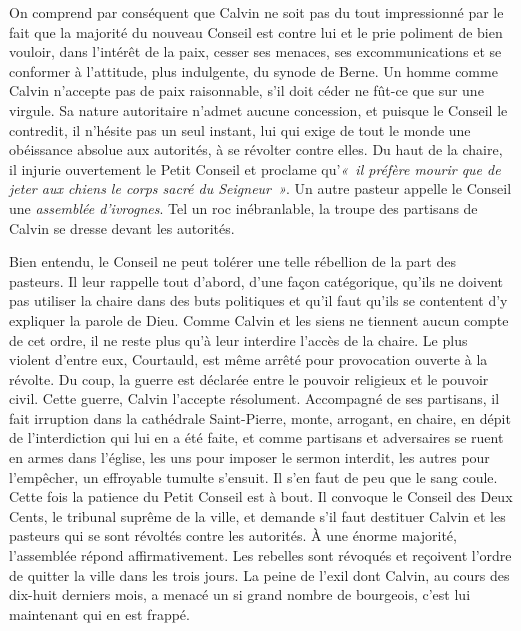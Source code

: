 \documentclass[french,twoside]{book} %
\newcommand{\astermono}{\medskip\centerline{\color{rubric}\large\selectfont{\syms ✻}}\medskip\par}%
\begin{document}
On comprend par conséquent que Calvin ne soit pas du tout impressionné par le fait que la majorité du nouveau Conseil est contre lui et le prie poliment de bien vouloir, dans l’intérêt de la paix, cesser ses menaces, ses excommunications et se conformer à l’attitude, plus indulgente, du synode de Berne. Un homme comme Calvin n’accepte pas de paix raisonnable, s’il doit céder ne fût-ce que sur une virgule. Sa nature autoritaire n’admet aucune concession, et puisque le Conseil le contredit, il n’hésite pas un seul instant, lui qui exige de tout le monde une obéissance absolue aux autorités, à se révolter contre elles. Du haut de la chaire, il injurie ouvertement le Petit Conseil et proclame qu’\emph{« il préfère mourir que de jeter aux chiens le corps sacré du Seigneur »}. Un autre pasteur appelle le Conseil une \emph{assemblée d’ivrognes}. Tel un roc inébranlable, la troupe des partisans de Calvin se dresse devant les autorités.\par
Bien entendu, le Conseil ne peut tolérer une telle rébellion de la part des pasteurs. Il leur rappelle tout d’abord, d’une façon catégorique, qu’ils ne doivent pas utiliser la chaire dans des buts politiques et qu’il faut qu’ils se contentent d’y expliquer la parole de Dieu. Comme Calvin et les siens ne tiennent aucun compte de cet ordre, il ne reste plus qu’à leur interdire l’accès de la chaire. Le plus violent d’entre eux, Courtauld, est même arrêté pour provocation ouverte à la révolte. Du coup, la guerre est déclarée entre le pouvoir religieux et le pouvoir civil. Cette guerre, Calvin l’accepte résolument. Accompagné de ses partisans, il fait irruption dans la cathédrale Saint-Pierre, monte, arrogant, en chaire, en dépit de l’interdiction qui lui en a été faite, et comme partisans et adversaires se ruent en armes dans l’église, les uns pour imposer le sermon interdit, les autres pour l’empêcher, un effroyable tumulte s’ensuit. Il s’en faut de peu que le sang coule. Cette fois la patience du Petit Conseil est à bout. Il convoque le Conseil des Deux Cents, le tribunal suprême de la ville, et demande s’il faut destituer Calvin et les pasteurs qui se sont révoltés contre les autorités. À une énorme majorité, l’assemblée répond affirmativement. Les rebelles sont révoqués et reçoivent l’ordre de quitter la ville dans les trois jours. La peine de l’exil dont Calvin, au cours des dix-huit derniers mois, a menacé un si grand nombre de bourgeois, c’est lui maintenant qui en est frappé.\par

\astermono
\end{document}
